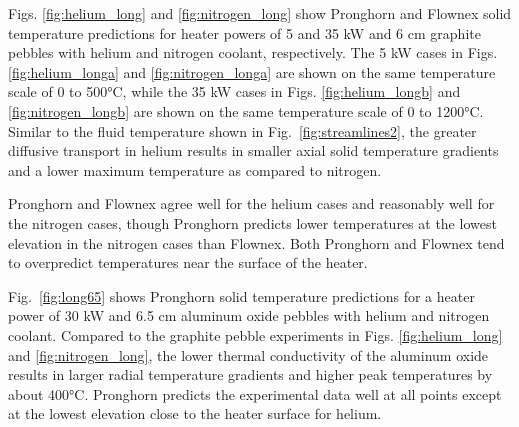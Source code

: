 Figs. \ref{fig:helium_long} and \ref{fig:nitrogen_long} show Pronghorn and Flownex solid temperature predictions for heater powers of 5 and 35 \si{\kilo\watt} and 6 \si{\centi\meter} graphite pebbles with helium and nitrogen coolant, respectively. The 5 \si{\kilo\watt} cases in Figs. \ref{fig:helium_longa} and \ref{fig:nitrogen_longa} are shown on the same temperature scale of 0 to 500\si{\celsius}, while the 35 \si{\kilo\watt} cases in Figs. \ref{fig:helium_longb} and \ref{fig:nitrogen_longb} are shown on the same temperature scale of 0 to 1200\si{\celsius}. Similar to the fluid temperature shown in Fig.\ \ref{fig:streamlines2}, the greater diffusive transport in helium results in smaller axial solid temperature gradients and a lower maximum temperature as compared to nitrogen. 

Pronghorn and Flownex agree well for the helium cases and reasonably well for the nitrogen cases, though Pronghorn predicts lower temperatures at the lowest elevation in the nitrogen cases than Flownex. Both Pronghorn and Flownex tend to overpredict temperatures near the surface of the heater.

Fig.\ \ref{fig:long65} shows Pronghorn solid temperature predictions for a heater power of 30 \si{\kilo\watt} and 6.5 \si{\centi\meter} aluminum oxide pebbles with helium and nitrogen coolant. Compared to the graphite pebble experiments in Figs. \ref{fig:helium_long} and \ref{fig:nitrogen_long}, the lower thermal conductivity of the aluminum oxide results in larger radial temperature gradients and higher peak temperatures by about 400\si{\celsius}. Pronghorn predicts the experimental data well at all points except at the lowest elevation close to the heater surface for helium.

